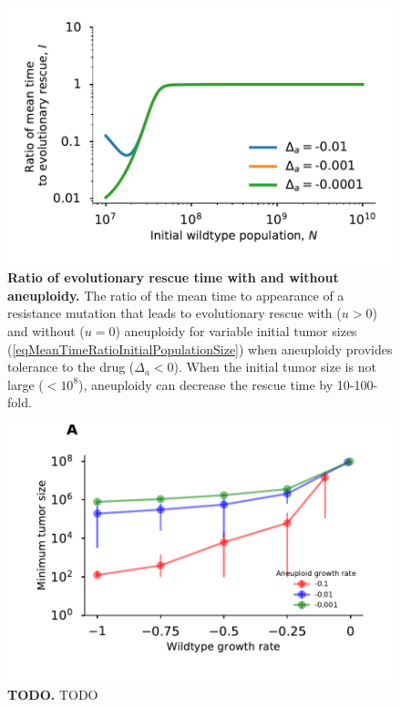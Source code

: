 \documentclass[12pt]{extarticle}
\begin{document}

\begin{figure}
 \vspace*{1\baselineskip}
\includegraphics[width=1\textwidth]{Figures/MeanTimeRatioInitialPopulationSize.pdf}
\caption{\textbf{Ratio of evolutionary rescue time with and without aneuploidy.}
The ratio of the mean time to appearance of a resistance mutation that leads to evolutionary rescue with ($u>0$) and without ($u=0$) aneuploidy for variable initial tumor sizes (\cref{eqMeanTimeRatioInitialPopulationSize}) when aneuploidy provides tolerance to the drug ($\Delta_a < 0$). When the initial tumor size is not large ($<10^8$), aneuploidy can decrease the rescue time by 10-100-fold.
}
\label{MeanTimeRatioInitialPopulationSize}
\end{figure}


\begin{figure}
 \vspace*{1\baselineskip}
\includegraphics[width=1\textwidth]{Figures/ThresholdPopulationSize.pdf}
\caption{\textbf{TODO.}
TODO
}
\label{MinTumorSize}
\end{figure}
\end{document}
